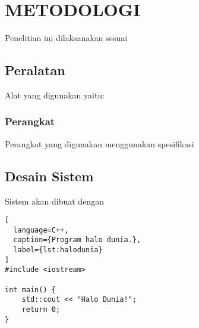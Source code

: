 \chapter{METODOLOGI}
\label{chap:metodologi}


Penelitian ini dilaksanakan sesuai \lipsum[1][1-5]


\section{Peralatan}
\label{sec:peralatan}

Alat yang digunakan yaitu: \lipsum[1]

\subsection{Perangkat}
\label{subsec:perangkat}

Perangkat yang digunakan menggunakan spesifikasi \lipsum[1]

\section{Desain Sistem}
\label{sec:desainsistem}

Sistem akan dibuat dengan \lipsum[1-2]



\begin{lstlisting}[
  language=C++,
  caption={Program halo dunia.},
  label={lst:halodunia}
]
#include <iostream>

int main() {
    std::cout << "Halo Dunia!";
    return 0;
}
\end{lstlisting}

\lipsum[2-3]



\lipsum[4]
